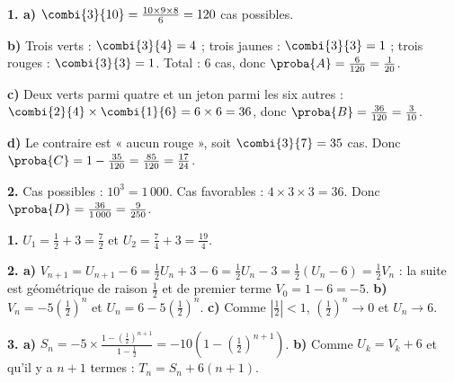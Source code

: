\begin{corrige}
\textbf{1. a)} $\combi{3}{10} = \frac{10\times9\times8}{6} = 120$ cas
possibles.

\textbf{b)} Trois verts : $\combi{3}{4} = 4$ ; trois jaunes :
$\combi{3}{3} = 1$ ; trois rouges : $\combi{3}{3} = 1$. Total : $6$ cas,
donc $\proba{A} = \frac{6}{120} = \frac{1}{20}$.

\textbf{c)} Deux verts parmi quatre et un jeton parmi les six autres :
$\combi{2}{4}\times\combi{1}{6} = 6\times6 = 36$, donc
$\proba{B} = \frac{36}{120} = \frac{3}{10}$.

\textbf{d)} Le contraire est « aucun rouge », soit
$\combi{3}{7} = 35$ cas. Donc
$\proba{C} = 1-\frac{35}{120} = \frac{85}{120} = \frac{17}{24}$.

\textbf{2.} Cas possibles : $10^{3} = 1\,000$. Cas favorables :
$4\times3\times3 = 36$. Donc
$\proba{D} = \frac{36}{1\,000} = \frac{9}{250}$.
\end{corrige}

\begin{corrige}
\textbf{1.} $U_{1} = \frac12+3 = \frac72$ et
$U_{2} = \frac74+3 = \frac{19}{4}$.

\textbf{2. a)} $V_{n+1} = U_{n+1}-6 = \frac12U_{n}+3-6 = \frac12U_{n}-3
= \frac12\left(U_{n}-6\right) = \frac12 V_{n}$ : la suite est géométrique
de raison $\frac12$ et de premier terme $V_{0} = 1-6 = -5$.
\textbf{b)} $V_{n} = -5\left(\frac12\right)^{n}$ et
$U_{n} = 6-5\left(\frac12\right)^{n}$.
\textbf{c)} Comme $\left|\frac12\right|<1$, $\left(\frac12\right)^{n} \to 0$
et $U_{n} \to 6$.

\textbf{3. a)} $S_{n} = -5\times
\frac{1-\left(\frac12\right)^{n+1}}{1-\frac12}
= -10\left(1-\left(\frac12\right)^{n+1}\right)$.
\textbf{b)} Comme $U_{k} = V_{k}+6$ et qu'il y a $n+1$ termes :
$T_{n} = S_{n}+6(n+1)$.
\end{corrige}

